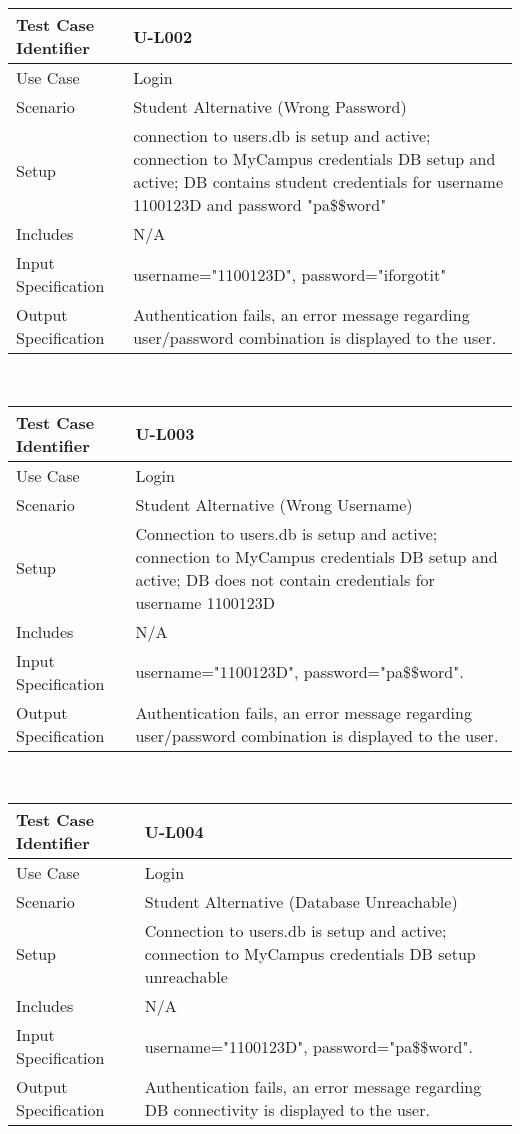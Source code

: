 \documentclass{l3deliverable}
\begin{document}
\begin{tabular}{lp{10cm}}
\hline 
\textbf{Test Case Identifier} & U-L002 \tabularnewline
\hline 
\hline 
Use Case & Login \tabularnewline
\hline 
Scenario & Student Alternative (Wrong Password) \tabularnewline
\hline 
Setup & connection to users.db is setup and active; connection to MyCampus credentials DB setup and active; DB contains student credentials for username 1100123D and password "pa\$\$word" \tabularnewline
\hline 
Includes & N/A \tabularnewline
\hline 
Input Specification & username="1100123D", password="iforgotit" \tabularnewline
\hline 
Output Specification & Authentication fails, an error message regarding user/password combination is displayed to the user.\tabularnewline
\hline 
\end{tabular}\\



\begin{tabular}{lp{10cm}}
\hline 
\textbf{Test Case Identifier} & U-L003\tabularnewline
\hline 
\hline 
Use Case & Login \tabularnewline
\hline 
Scenario & Student Alternative (Wrong Username) \tabularnewline
\hline 
Setup & Connection to users.db is setup and active; connection to MyCampus credentials DB setup and active; DB does not contain credentials for username 1100123D  \tabularnewline
\hline 
Includes & N/A \tabularnewline
\hline 
Input Specification & username="1100123D", password="pa\$\$word".\tabularnewline
\hline 
Output Specification & Authentication fails, an error message regarding user/password combination is displayed to the user.\tabularnewline
\hline 
\end{tabular}\\


\begin{tabular}{lp{10cm}}
\hline 
\textbf{Test Case Identifier} & U-L004\tabularnewline
\hline 
\hline 
Use Case & Login \tabularnewline
\hline 
Scenario & Student Alternative (Database Unreachable) \tabularnewline
\hline 
Setup & Connection to users.db is setup and active; connection to MyCampus credentials DB setup unreachable \tabularnewline
\hline 
Includes & N/A \tabularnewline
\hline 
Input Specification & username="1100123D", password="pa\$\$word".\tabularnewline
\hline 
Output Specification & Authentication fails, an error message regarding DB connectivity is displayed to the user.\tabularnewline
\hline 
\end{tabular}\\
\end{document}
